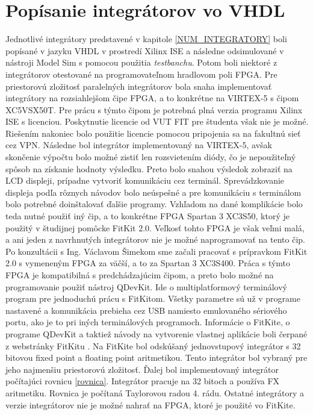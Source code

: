 \chapter{Popísanie integrátorov vo VHDL} \label{IMPLEMENTACIA}
Jednotlivé integrátory predstavené v kapitole \ref{NUM_INTEGRATORY} boli popísané v jazyku VHDL v prostredí Xilinx ISE a následne odsimulované v nástroji Model Sim s pomocou použitia \textit{testbanchu}. Potom boli niektoré z integrátorov otestované na programovateľnom hradlovom poli FPGA.
Pre priestorovú zložitosť paralelných integrátorov bola snaha implementovať integrátory na rozsiahlejšom čipe FPGA, a to konkrétne na VIRTEX-5 s čipom XC5VSX50T. Pre prácu s týmto čipom je potrebná plná verzia programu Xilinx ISE s licenciou. Poskytnutie licencie od VUT FIT pre študenta však nie je možné. Riešením nakoniec bolo použitie licencie pomocou pripojenia sa na fakultnú sieť cez VPN. Následne bol integrátor implementovaný na VIRTEX-5, avšak skončenie výpočtu bolo možné zistiť len rozsvietením diódy, čo je nepoužiteľný spôsob na získanie hodnoty výsledku. Preto bolo snahou výsledok zobraziť na LCD displeji, prípadne vytvoriť komunikáciu cez terminál. Sprevádzkovanie displeja podľa rôznych návodov bolo neúspešné a pre komunikáciu s terminálom bolo potrebné doinštalovať ďalšie programy. Vzhľadom na dané komplikácie bolo teda nutné použiť iný čip, a to konkrétne FPGA Spartan 3 XC3S50, ktorý je použitý v študijnej pomôcke FitKit 2.0. Veľkosť tohto FPGA je však veľmi malá, a ani jeden z navrhnutých integrátorov nie je možné naprogramovať na tento čip. Po konzultácii s Ing. Václavom Šimekom sme začali pracovať s prípravkom FitKit 2.0 s vymeneným FPGA za väčší, a to za Spartan 3 XC3S400. Práca s týmto FPGA je kompatibilná s predchádzajúcim čipom, a preto bolo možné na programovanie použiť nástroj QDevKit. Ide o multiplatformový terminálový program pre jednoduchú prácu s FitKitom. Všetky parametre sú už v programe nastavené a komunikácia prebieha cez USB namiesto emulovaného sériového portu, ako je to pri iných terminálových programoch. Informácie o FitKite, o programe QDevKit a taktiež návody na vytvorenie vlastnej aplikácie boli čerpané z webstránky FitKitu \cite{fitkit}.
Na FitKite bol odskúšaný jednovstupový integrátor s 32 bitovou fixed point a floating point aritmetikou. Tento integrátor bol vybraný pre jeho najmenšiu priestorovú zložitosť. Ďalej bol implementovaný integrátor počítajúci rovnicu \ref{rovnica}. Integrátor pracuje na 32 bitoch a používa FX aritmetiku. Rovnica je počítaná Taylorovou radou 4. rádu. Ostatné integrátory a verzie integrátorov nie je možné nahrať na FPGA, ktoré je použité vo FitKite.

